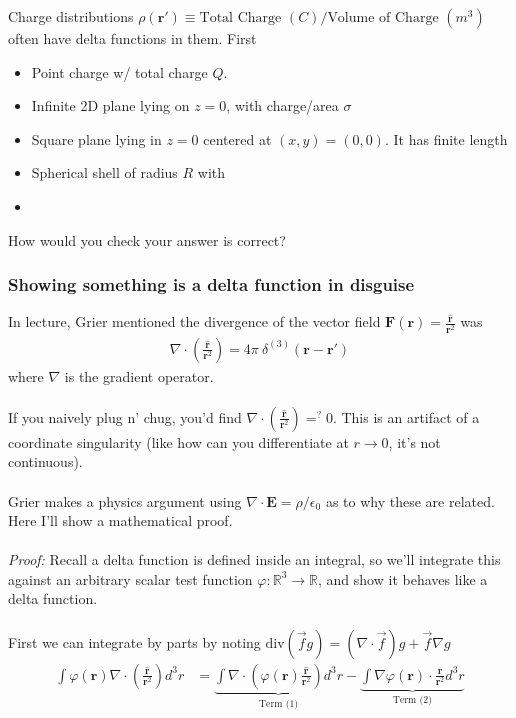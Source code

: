 \documentclass[12pt,fleqn]{article}
\numberwithin{equation}{section} %
\newcounter{problem}
\begin{document}
\begin{problem}
	Charge distributions $\rho(\mathbf r') \equiv \text{Total Charge } (C) / \text{Volume of Charge } (m^3)$ often have delta functions in them. First 
	\begin{itemize}
		\item Point charge w/ total charge $Q$.
		\item Infinite 2D plane lying on $z=0$, with charge/area $\sigma$
		\item Square plane lying in $z=0$ centered at $(x,y) = (0,0)$. It has finite length 
		\item Spherical shell of radius $R$ with  
		\item 
	\end{itemize}
	How would you check your answer is correct?
\end{problem}

\subsubsection{Showing something is a delta function in disguise}
In lecture, Grier mentioned the divergence of the vector field $\mathbf F(\mathbf r) = \frac{\mathbf{\hat{r}}}{\mathbf r^2}$ was
\begin{align}
	\boxed{\nabla \cdot \left ( \frac{\mathbf{\hat{r}}}{\mathbf r^2}\right) = 4\pi ~\delta^{(3)} (\mathbf r - \mathbf r')}
\end{align}
where $\nabla$ is the gradient operator.\\
\\
If you naively plug n' chug, you'd find $\nabla \cdot \left ( \frac{\mathbf{\hat{r}}}{\mathbf r^2}\right) =^? 0$. This is an artifact of a coordinate singularity (like how can you differentiate at $r \to 0$, it's not continuous). \\
\\
Grier makes a physics argument using $\nabla \cdot \mathbf E =  \rho / \epsilon_0$ as to why these are related. Here I'll show a mathematical proof.
\\
\\
\emph{Proof:} Recall a delta function is defined inside an integral, so we'll integrate this against an arbitrary scalar test function $\varphi : \mathbb R^3 \to \mathbb R$, and show it behaves like a delta function.\\
\\
First we can integrate by parts by noting $\text{div}(\vec f g) = (\nabla \cdot \vec f) g + \vec f \nabla g$
\begin{align}
	\int \varphi(\mathbf r) \nabla \cdot \left( \frac{\mathbf{\hat{r}}}{\mathbf r^2} \right) d^3 r & = \underbrace{\int \nabla\cdot (\varphi(\mathbf r) \frac{\mathbf{\hat{r}}}{\mathbf r^2}) d^3r}_{\text{Term (1)}} - \underbrace{\int \nabla\varphi(\mathbf r) \cdot \frac{\mathbf{\hat{r}}}{\mathbf r^2} d^3r}_{\text{Term (2)}}
\end{align}
\end{document}
